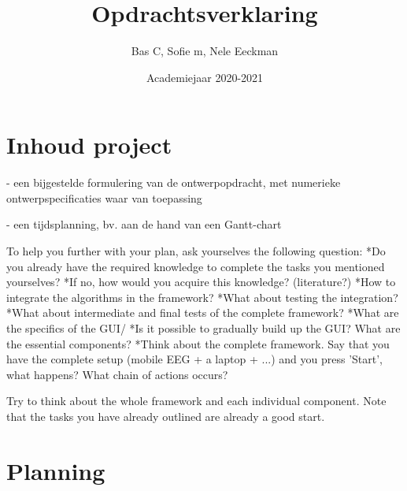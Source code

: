 \documentclass[a4paper,kul]{kulakarticle}
\date{Academiejaar 2020-2021}
\title{Opdrachtsverklaring}
\author{Bas C, Sofie m, Nele Eeckman}
\begin{document}
	\maketitle
	
	\section*{Inhoud project}
	- een bijgestelde formulering van de ontwerpopdracht, met numerieke ontwerpspecificaties waar van toepassing
	
	- een tijdsplanning, bv. aan de hand van een Gantt-chart
	
	To help you further with your plan, ask yourselves the following question:
	*Do you already have the required knowledge to complete the tasks you mentioned yourselves?
	*If no, how would you acquire this knowledge? (literature?)
	*How to integrate the algorithms in the framework?
	*What about testing the integration?
	*What about intermediate and final tests of the complete framework?
	*What are the specifics of the GUI/
	*Is it possible to gradually build up the GUI? What are the essential components?
	*Think about the complete framework. Say that you have the complete setup (mobile EEG + a laptop + ...) and you press 'Start', what happens? What chain of actions occurs? 
	
	Try to think about the whole framework and each individual component. Note that the tasks you have already outlined are already a good start.
	
	
	\section*{Planning}
	
\end{document}
